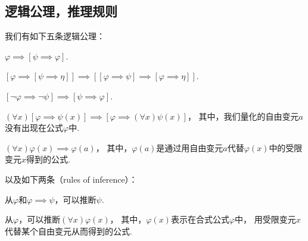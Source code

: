 \subsection{逻辑公理，推理规则}
我们有如下五条逻辑公理：
\begin{axiom}
\(\varphi \implies [\psi \implies \varphi]\).
\end{axiom}
\begin{axiom}
\([\varphi \implies [\psi \implies \eta]] \implies [[\varphi \implies \psi] \implies [\varphi \implies \eta]]\).
\end{axiom}
\begin{axiom}
\([\neg\varphi \implies \neg\psi] \implies [\psi \implies \varphi]\).
\end{axiom}
\begin{axiom}
\((\forall x)[\varphi \implies \psi(x)] \implies [\varphi \implies (\forall x) \psi(x)]\)，
其中，我们量化的自由变元\(a\)没有出现在公式\(\varphi\)中.
\end{axiom}
\begin{axiom}
\((\forall x) \varphi(x) \implies \varphi(a)\)，
其中，\(\varphi(a)\)是通过用自由变元\(a\)代替\(\varphi(x)\)中的受限变元\(x\)得到的公式.
\end{axiom}
以及如下两条（rules of inference）：
\begin{axiom}
从\(\varphi\)和\(\varphi \implies \psi\)，可以推断\(\psi\).
\end{axiom}
\begin{axiom}
从\(\varphi\)，可以推断\((\forall x) \varphi(x)\)，
其中，\(\varphi(x)\)表示在合式公式\(\varphi\)中，
用受限变元\(x\)代替某个自由变元从而得到的公式.
\end{axiom}
